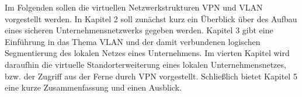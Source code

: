 Im Folgenden sollen die virtuellen Netzwerkstrukturen VPN und VLAN vorgestellt werden. In Kapitel 2 soll zunächst kurz ein Überblick über des Aufbau eines sicheren Unternehmensnetzwerks gegeben werden. Kapitel 3 gibt eine Einführung in das Thema VLAN und der damit verbundenen logischen Segmentierung des lokalen Netzes eines Unternehmens. Im vierten Kapitel wird daraufhin die virtuelle Standorterweiterung eines lokalen Unternehmensnetzes, bzw. der Zugriff aus der Ferne durch VPN vorgestellt. 
Schließlich bietet Kapitel 5 eine kurze Zusammenfassung und einen Ausblick. 


































